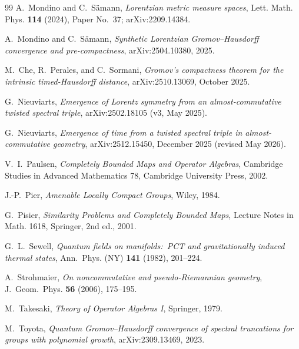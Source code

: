 \documentclass[11pt,a4paper]{article}
\theoremstyle{plain}
\theoremstyle{definition}
\begin{document}
\begin{thebibliography}{99}
A.~Mondino and C.~Sämann,
\newblock \emph{Lorentzian metric measure spaces},
\newblock Lett. Math. Phys. \textbf{114} (2024), Paper No.~37;
\newblock arXiv:2209.14384.

A.~Mondino and C.~Sämann,
\newblock \emph{Synthetic Lorentzian Gromov--Hausdorff convergence
and pre-compactness},
\newblock arXiv:2504.10380, 2025.

M.~Che, R.~Perales, and C.~Sormani,
\newblock \emph{Gromov's compactness theorem for the intrinsic
timed-Hausdorff distance},
\newblock arXiv:2510.13069, October 2025.

G.~Nieuviarts,
\newblock \emph{Emergence of Lorentz symmetry from an almost-commutative
twisted spectral triple},
\newblock arXiv:2502.18105 (v3, May 2025).

G.~Nieuviarts,
\newblock \emph{Emergence of time from a twisted spectral triple in
almost-commutative geometry},
\newblock arXiv:2512.15450, December 2025 (revised May 2026).

V.~I.~Paulsen,
\newblock \emph{Completely Bounded Maps and Operator Algebras},
\newblock Cambridge Studies in Advanced Mathematics 78,
Cambridge University Press, 2002.

J.-P.~Pier,
\newblock \emph{Amenable Locally Compact Groups},
\newblock Wiley, 1984.

G.~Pisier,
\newblock \emph{Similarity Problems and Completely Bounded Maps},
\newblock Lecture Notes in Math. 1618, Springer, 2nd ed., 2001.

G.~L.~Sewell,
\newblock \emph{Quantum fields on manifolds:\ PCT and gravitationally
induced thermal states},
\newblock Ann.~Phys. (NY) \textbf{141} (1982), 201--224.

A.~Strohmaier,
\newblock \emph{On noncommutative and pseudo-Riemannian geometry},
\newblock J.~Geom.~Phys. \textbf{56} (2006), 175--195.

M.~Takesaki,
\newblock \emph{Theory of Operator Algebras I},
\newblock Springer, 1979.

M.~Toyota,
\newblock \emph{Quantum Gromov--Hausdorff convergence of spectral
truncations for groups with polynomial growth},
\newblock arXiv:2309.13469, 2023.


\end{thebibliography}
\end{document}
